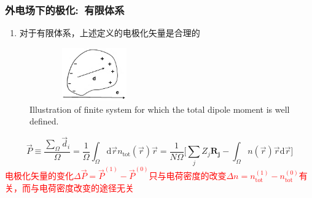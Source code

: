 \frame
{
	\frametitle{外电场下的极化:~有限体系}
			\begin{enumerate}
				\item 对于有限体系，上述定义的电极化矢量是合理的
			\end{enumerate}
\begin{figure}[h!]
\centering
\vspace*{-0.08in}
\includegraphics[height=0.9in,width=2.2in,viewport=0 0 1100 550,clip]{Figures/Polarize_insulator.png}
\caption{\tiny \textrm{Illustration of finite system for which the total dipole moment is well defined.}}%
\label{Polarization_insulator}
\end{figure} 
\fontsize{8.5pt}{2.2pt}\selectfont{对有限体系，当外部电场$\vec E(\vec r)=0$，宏观电极化矢量$\vec P$可用偶极矩$\vec d$表示}
\begin{displaymath}
	\vec P\equiv\frac{\sum\limits_{\Omega}\vec d_i}{\Omega}=\frac1{\Omega}\int_{\Omega}\mathrm{d}\vec rn_{\mathrm{tot}}(\vec r)\vec r=\dfrac1{N\Omega}\bigg[\sum_jZ_j\mathbf{R_j}-\int_{\Omega}n(\vec r)\vec r\mathrm{d}\vec r\bigg]
\end{displaymath}
\textcolor{red}{电极化矢量的变化$\Delta\vec P=\vec P^{(1)}-\vec P^{(0)}$只与电荷密度的改变$\Delta n=n_{\mathrm{tot}}^{(1)}-n_{\mathrm{tot}}^{(0)}$有关，而与电荷密度改变的途径无关}
}


